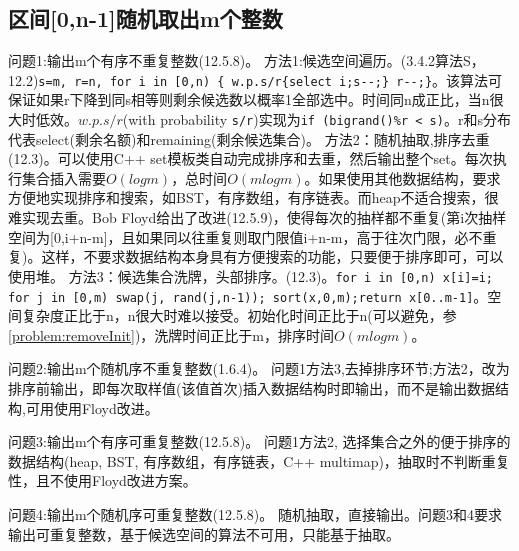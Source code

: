 \subsection{区间[0,n-1]随机取出m个整数}

问题1:输出m个有序不重复整数(\cite{pp}12.5.8)。
方法1:候选空间遍历。(\cite{acp}3.4.2算法S，\cite{pp}12.2)\verb|s=m, r=n, for i in [0,n) { w.p.s/r{select i;s--;} r--;}|。该算法可保证如果r下降到同s相等则剩余候选数以概率1全部选中。时间同n成正比，当n很大时低效。$w.p.s/r$(with probability \verb|s/r|)实现为\verb|if (bigrand()%r < s)|。r和s分布代表select(剩余名额)和remaining(剩余候选集合)。
方法2：随机抽取,排序去重(\cite{pp}12.3)。可以使用C++ set模板类自动完成排序和去重，然后输出整个set。每次执行集合插入需要$O(logm)$，总时间$O(mlog m)$。如果使用其他数据结构\cite{self}，要求方便地实现排序和搜索，如BST，有序数组，有序链表。而heap不适合搜索，很难实现去重。Bob Floyd给出了改进(\cite{pp}12.5.9)，使得每次的抽样都不重复(第i次抽样空间为[0,i+n-m]，且如果同以往重复则取门限值i+n-m，高于往次门限，必不重复)。这样，不要求数据结构本身具有方便搜索的功能，只要便于排序即可，可以使用堆。
方法3：候选集合洗牌，头部排序。(\cite{pp}12.3)。\verb|for i in [0,n) x[i]=i; for j in [0,m) swap(j, rand(j,n-1)); sort(x,0,m);return x[0..m-1]|。空间复杂度正比于n，n很大时难以接受。初始化时间正比于n(可以避免，参\ref{problem:removeInit})，洗牌时间正比于m，排序时间$O(mlogm)$。

问题2:输出m个随机序不重复整数(\cite{pp}1.6.4)。
问题1方法3,去掉排序环节;方法2，改为排序前输出，即每次取样值(该值首次)插入数据结构时即输出，而不是输出数据结构,可用使用Floyd改进。

问题3:输出m个有序可重复整数(\cite{pp}12.5.8)。
问题1方法2, 选择集合之外的便于排序的数据结构(heap, BST, 有序数组，有序链表，C++ multimap)，抽取时不判断重复性，且不使用Floyd改进方案。

问题4:输出m个随机序可重复整数(\cite{pp}12.5.8)。
随机抽取，直接输出。问题3和4要求输出可重复整数，基于候选空间的算法不可用，只能基于抽取。







